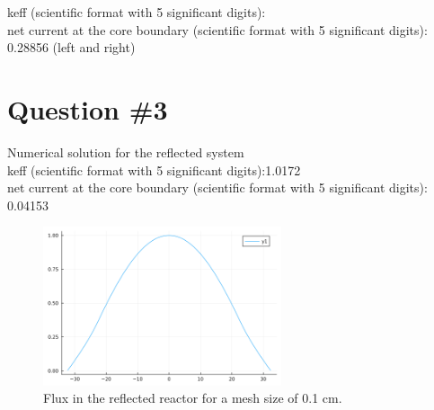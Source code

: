 \documentclass[11pt,a4paper]{article}
\begin{document}
keff (scientific format with 5 significant digits): \\
net current at the core boundary (scientific format with 5 significant digits): 0.28856 (left and right)\\

\section{Question \#3}
Numerical solution for the reflected system \\
keff (scientific format with 5 significant digits):1.0172\\
net current at the core boundary (scientific format with 5 significant digits): 0.04153\\
\begin{figure}[h]
	\includegraphics[width=7cm]{../figs/ex2/reflector.png}
	\centering
	\caption{Flux in the reflected reactor for a mesh size of 0.1 cm.}
\end{figure}

\end{document}
